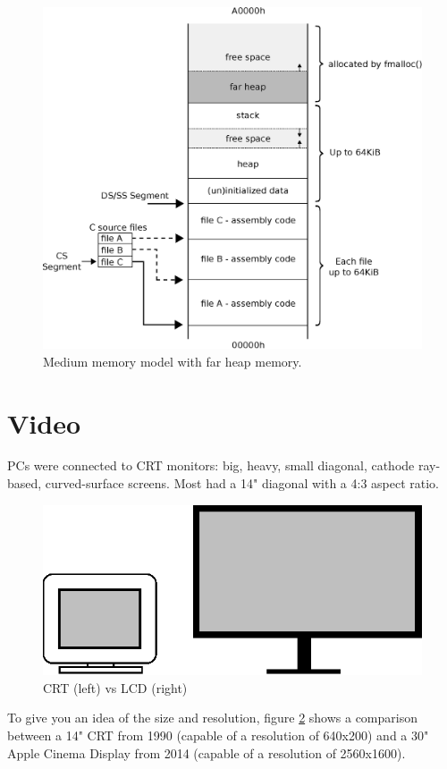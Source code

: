 \documentclass[book.tex]{subfiles}
\begin{document}
\begin{figure}[H]
\centering
\includegraphics[width=1.0\textwidth]{imgs/drawings/memory/farheap_medium_model.eps}
\caption{Medium memory model with far heap memory.}
\label{fig:mm_farheap}
\end{figure}
\par


\section{Video}

PCs were connected to CRT monitors: big, heavy, small diagonal, cathode ray-based, curved-surface screens. Most had a 14" diagonal with a 4:3 aspect ratio.\\
\par


\begin{figure}[H]
\centering
\includegraphics[width=\textwidth]{imgs/drawings/crt_lcd.eps}
\caption{CRT (left) vs LCD (right)}
\label{fig:lcd_vs_crt}
\end{figure}
\par
  To give you an idea of the size and resolution, figure \ref{fig:lcd_vs_crt} shows a comparison between a 14" CRT from 1990 (capable of a resolution of 640x200) and a 30" Apple Cinema Display from 2014 (capable of a resolution of 2560x1600).\\
  \par
{}
\\
\end{document}
